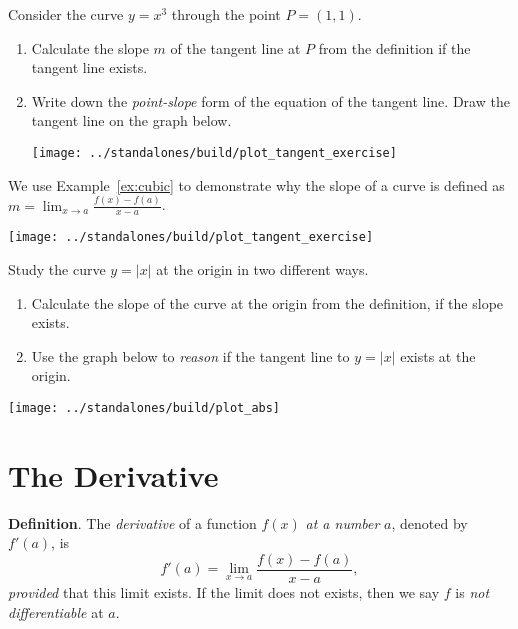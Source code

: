 \documentclass[../main.tex]{subfiles}
\begin{document}
\begin{example} \label{ex:cubic}
  Consider the curve \(y = x^{3}\) through the point \(P = (1,1)\).

  \begin{enumerate}
    \item Calculate the slope \(m\) of the tangent line at \(P\) from the definition if the tangent line exists.
      \vfill

    \item Write down the \emph{point-slope} form of the equation of the tangent line. Draw the tangent line on the graph below.

      \texttt{[image: ../standalones/build/plot\_tangent\_exercise]}
  \end{enumerate}
\end{example}
\clearpage

We use Example~\ref{ex:cubic} to demonstrate why the slope of a curve is defined as \(m = \lim_{x \to a} \frac{f(x) - f(a)}{x - a}\).

\texttt{[image: ../standalones/build/plot\_tangent\_exercise]}
\bigskip


\begin{example}
  Study the curve \(y = |x|\) at the origin in two different ways.
  \begin{enumerate}
    \item Calculate the slope of the curve at the origin from the definition, if the slope exists. 
      \vfill

    \item Use the graph below to \emph{reason} if the tangent line to \(y = |x|\) exists at the origin.
  \end{enumerate}
  \texttt{[image: ../standalones/build/plot\_abs]}
\end{example}
\clearpage

\section{The Derivative}

\begin{mdframed}[style=withref]
  \textbf{Definition}. The \emph{derivative} of a function \(f(x)\) \emph{at a number} \(a\), denoted by \(f'(a)\), is
  \begin{equation} \label{eq:tangent2}
    f'(a) = \lim_{x \to a} \frac{f(x) - f(a)}{x - a},
  \end{equation}
  \emph{provided} that this limit exists. If the limit does not exists, then we say \(f\) is \emph{not differentiable} at \(a\).

\end{mdframed}
\vspace{2in}
\end{document}
